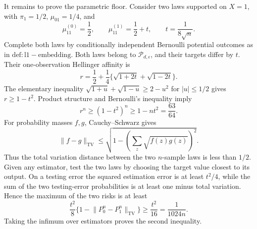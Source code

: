 It remains to prove the parametric floor.  Consider two laws supported on \(X=1\), with \(\pi_1=1/2\), \(\mu_{01}=1/4\), and
\[
 \mu_{11}^{(0)}=\frac12,
 \qquad
 \mu_{11}^{(1)}=\frac12+t,
 \qquad
 t=\frac{1}{8\sqrt n}.
\]
Complete both laws by conditionally independent Bernoulli potential outcomes as in \(\mathrm{def:l1-embedding}\).  Both laws belong to \(\mathcal P_{d,\epsilon}\), and their targets differ by \(t\).  Their one-observation Hellinger affinity is
\[
 r=\frac12+\frac14\{\sqrt{1+2t}+\sqrt{1-2t}\}.
\]
The elementary inequality
\(\sqrt{1+u}+\sqrt{1-u}\ge2-u^2\) for \(\lvert u\rvert\le1/2\) gives \(r\ge1-t^2\).  Product structure and Bernoulli's inequality imply
\[
 r^n\ge(1-t^2)^n\ge1-nt^2=\frac{63}{64}.
\]
For probability masses \(f,g\), Cauchy--Schwarz gives
\[
 \lVert f-g\rVert_{\mathrm{TV}}
 \le\sqrt{1-\left(\sum_z\sqrt{f(z)g(z)}\right)^2}.
\]
Thus the total variation distance between the two \(n\)-sample laws is less than \(1/2\).  Given any estimator, test the two laws by choosing the target value closest to its output.  On a testing error the squared estimation error is at least \(t^2/4\), while the sum of the two testing-error probabilities is at least one minus total variation.  Hence the maximum of the two risks is at least
\[
 \frac{t^2}{8}\{1-\lVert P_0^n-P_1^n\rVert_{\mathrm{TV}}\}
 \ge\frac{t^2}{16}
 =\frac{1}{1024n}.
\]
Taking the infimum over estimators proves the second inequality.